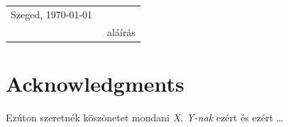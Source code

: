 \documentclass[12pt]{report}
\begin{document}
\vspace*{2cm}

\begin{tabular}{lc}
	Szeged, \today\
	\hspace{2cm} & \makebox[6cm]{\dotfill} \\
	& aláírás \\
\end{tabular}

\vspace*{4cm}

\chapter*{Acknowledgments}

Ezúton szeretnék köszönetet mondani \textit{X. Y-nak} ezért és ezért \ldots

 

\end{document}
